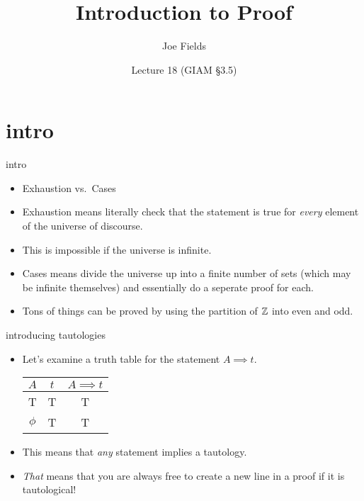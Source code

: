 \documentclass[landscape]{beamer}
\author{Joe Fields}
\title{Introduction to Proof}
\date{Lecture 18 (GIAM \S 3.5)}
\institute[SCSU]{ {\tt fieldsj1@southernct.edu} }
\begin{document}
\begin{frame}[plain]
  \titlepage
\end{frame}

\section{intro}

\begin{frame}{intro}
\begin{itemize}
\item Exhaustion vs.\ Cases \pause
\item Exhaustion means literally check that the statement is true for {\em every} element of the universe of discourse. \pause
\item This is impossible if the universe is infinite. \pause
\item Cases means divide the universe up into a finite number of sets (which may be infinite themselves) and essentially do a seperate proof for each.\pause
\item Tons of things can be proved by using the partition of ${\mathbb Z}$ into even and odd.
\end{itemize}
\end{frame}

\begin{frame}{introducing tautologies}
\begin{itemize}
\item Let's examine a truth table for the statement $A \implies t$. \pause

\begin{center}
\begin{tabular}{c|c|c}
$A$  & $t$ & $A \implies t$ \\ \hline
T & T & T \\
$\phi$ & T & T \\
\end{tabular}
\end{center}
\pause

\item This means that {\em any} statement implies a tautology. \pause
\item {\em That} means that you are always free to create a new line in a proof if it is tautological! 
\end{itemize}
\end{frame}
\end{document}
